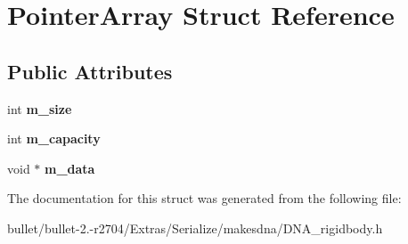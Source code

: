 \hypertarget{struct_pointer_array}{\section{Pointer\+Array Struct Reference}
\label{struct_pointer_array}
}
\subsection*{Public Attributes}
\begin{DoxyCompactItemize}
\item 
\hypertarget{struct_pointer_array_a032faf20cabeb8fde8ac839582c8ae37}{int {\bfseries m\+\_\+size}}\label{struct_pointer_array_a032faf20cabeb8fde8ac839582c8ae37}

\item 
\hypertarget{struct_pointer_array_a3dd91e90b07b16f7376f18b54e8e1890}{int {\bfseries m\+\_\+capacity}}\label{struct_pointer_array_a3dd91e90b07b16f7376f18b54e8e1890}

\item 
\hypertarget{struct_pointer_array_adbc2bf4cd0987f57d1de9c2035436efd}{void $\ast$ {\bfseries m\+\_\+data}}\label{struct_pointer_array_adbc2bf4cd0987f57d1de9c2035436efd}

\end{DoxyCompactItemize}


The documentation for this struct was generated from the following file\+:\begin{DoxyCompactItemize}
\item 
bullet/bullet-\/2.-\/r2704/\+Extras/\+Serialize/makesdna/D\+N\+A\+\_\+rigidbody.\+h\end{DoxyCompactItemize}
